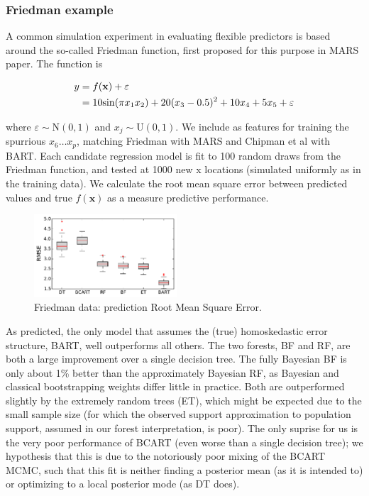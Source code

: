 \documentclass{article}
\begin{document}
\subsubsection{Friedman example}\label{friedman-example}

A common simulation experiment in evaluating flexible predictors is
based around the so-called Friedman function, first proposed for this
purpose in \cite{friedman_multivariate_1991} MARS paper. The function is

\begin{align}
y &= f(\mathbf{x}) +  \varepsilon \\ &= 10\mathrm{sin}(\pi x_1 x_2) + 20 (x_3-0.5)^2 + 10x_4 + 5x_5 + \varepsilon\notag
\end{align}

where $\varepsilon \sim \mathrm{N}(0,1)$ and $x_j \sim \mathrm{U}(0,1)$.
We include as features for training the spurrious $x_6 \dots x_{p}$,
matching Friedman with MARS and Chipman et al with BART. Each candidate
regression model is fit to 100 random draws from the Friedman function,
and tested at 1000 new x locations (simulated uniformly as in the
training data). We calculate the root mean square error between
predicted values and true $f(\mathbf{x})$ as a measure predictive
performance.

\begin{figure}
\includegraphics[width=0.475\textwidth]{../graphs/fried}
\caption{Friedman data:  prediction Root Mean Square Error.}
\end{figure}

    As predicted, the only model that assumes the (true) homoskedastic error
structure, BART, well outperforms all others. The two forests, BF and
RF, are both a large improvement over a single decision tree. The fully
Bayesian BF is only about 1\% better than the approximately Bayesian RF,
as Bayesian and classical bootstrapping weights differ little in
practice. Both are outperformed slightly by the extremely random trees
(ET), which might be expected due to the small sample size (for which
the observed support approximation to population support, assumed in our
forest interpretation, is poor). The only suprise for us is the very
poor performance of BCART (even worse than a single decision tree); we
hypothesis that this is due to the notoriously poor mixing of the BCART
MCMC, such that this fit is neither finding a posterior mean (as it is
intended to) or optimizing to a local posterior mode (as DT does).
\end{document}
